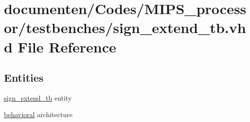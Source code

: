 \hypertarget{sign__extend__tb_8vhd}{\section{documenten/\-Codes/\-M\-I\-P\-S\-\_\-processor/testbenches/sign\-\_\-extend\-\_\-tb.vhd File Reference}
\label{sign__extend__tb_8vhd}
}
\subsection*{Entities}
\begin{DoxyCompactItemize}
\item 
\hyperlink{classsign__extend__tb}{sign\-\_\-extend\-\_\-tb} entity
\item 
\hyperlink{classsign__extend__tb_1_1behavioral}{behavioral} architecture
\end{DoxyCompactItemize}
